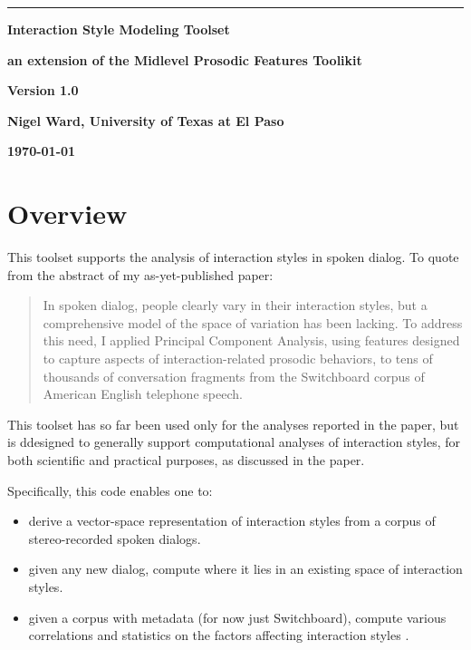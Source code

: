 \documentclass[11pt]{article}
\begin{document}
\noindent
\thispagestyle{empty}
\sloppy

\rule{1mm}{0mm}

\vspace{-17mm}
{\LARGE \bf Interaction Style Modeling  Toolset }

\smallskip
{\large \bf an extension of the  Midlevel Prosodic Features Toolikit}
\medskip


{\LARGE \bf Version 1.0}
\vspace{7mm}


{\bf Nigel Ward, University of Texas at El Paso}

{\bf \today }
\bigskip


\vspace{-3.5ex}
\section{Overview}    \label{sec:overview}

This toolset supports the analysis of interaction styles in spoken
dialog.  To quote from the abstract of  my as-yet-published paper:

\begin{quote}
  In spoken dialog, people clearly vary in their interaction styles,
  but a comprehensive model of the space of variation has been
  lacking.  To address this need, I applied Principal Component
  Analysis, using features designed to capture aspects of
  interaction-related prosodic behaviors, to tens of thousands of conversation
  fragments from the Switchboard corpus of American English telephone
  speech. 
\end{quote}


This toolset has so far been used only for the analyses reported in
the paper, but is ddesigned to generally support computational
analyses of interaction styles, for both scientific and practical
purposes, as discussed in the paper.

Specifically, this code enables one to:

\begin{itemize}   \setlength{\itemsep}{0pt}\setlength{\parskip}{0pt}
\item derive a vector-space representation of interaction styles from
  a corpus of stereo-recorded spoken dialogs.
\item given any new dialog, compute
  where it lies in an existing space of interaction styles.
\item given a corpus with metadata (for now just  Switchboard), compute various
  correlations and statistics on the factors affecting interaction styles .
\end{itemize}
\end{document}
